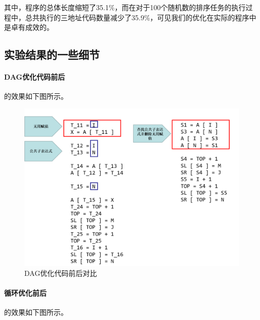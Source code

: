 \documentclass[cn,black,11pt,normal]{elegantnote}
\begin{document}
其中，程序的总体长度缩短了35.1\%，而在对于100个随机数的排序任务的执行过程中，总共执行的三地址代码数量减少了35.9\%，可见我们的优化在实际的程序中是卓有成效的。

\subsection{实验结果的一些细节}

\paragraph{DAG优化代码前后} 的效果如下图所示。

\begin{figure}[H]
    \centering
    \includegraphics[width=0.8\linewidth]{image/res_dag.png}
    \caption{DAG优化代码前后对比}
\end{figure}

\paragraph{循环优化前后} 的效果如下图所示。
\end{document}

